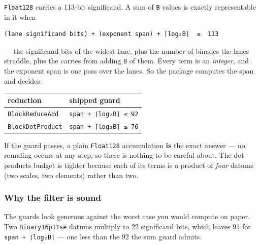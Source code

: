 \label{5256866751653830375}{}


\texttt{Float128} carries a 113-bit significand. A sum of \texttt{B} values is exactly representable in it when




\begin{verbatim}
(lane significand bits) + (exponent span) + ⌈log₂B⌉  ≤  113
\end{verbatim}



— the significand bits of the widest lane, plus the number of binades the lanes straddle, plus the carries from adding \texttt{B} of them. Every term is an \emph{integer}, and the exponent span is one pass over the lanes. So the package computes the span and decides:




\begin{table}[h]
\centering
\begin{tabulary}{\linewidth}{L L}
\toprule
reduction & shipped guard \\
\toprule
\texttt{BlockReduceAdd} & \texttt{span + ⌈log₂B⌉ ≤ 92} \\
\texttt{BlockDotProduct} & \texttt{span + ⌈log₂B⌉ ≤ 76} \\
\bottomrule
\end{tabulary}

\end{table}



If the guard passes, a plain \texttt{Float128} accumulation \textbf{is} the exact answer — no rounding occurs at any step, so there is nothing to be careful about. The dot product{\textquotesingle}s budget is tighter because each of its terms is a product of \emph{four} datums (two scales, two elements) rather than two.



\subsubsection{Why the filter is sound}



\label{1304468550602082720}{}


The guards look generous against the worst case you would compute on paper. Two \texttt{Binary16p11se} datums multiply to 22 significand bits, which leaves 91 for \texttt{span + ⌈log₂B⌉} — one less than the 92 the sum guard admits.



